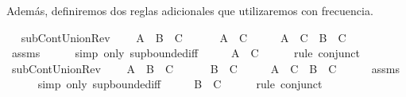 \begin{isabellebody}
\begin{isamarkuptext}
  Además, definiremos dos reglas adicionales que utilizaremos con 
  frecuencia.%
\end{isamarkuptext}\isamarkuptrue%
\ \isanewline
{}\isamarkupfalse%
\ subContUnionRev{}{\isacharcolon}\ \isanewline
\ \ \ {\isachardoublequoteopen}A\ {\isasymunion}\ B\ {\isasymsubseteq}\ C{\isachardoublequoteclose}\ \isanewline
\ \ \ \ \ {\isachardoublequoteopen}A\ {\isasymsubseteq}\ C{\isachardoublequoteclose}\isanewline
%
\isadelimproof
%
\endisadelimproof
%
\isatagproof
{}\isamarkupfalse%
\ {\isacharminus}\isanewline
\ \ \isamarkupfalse%
\ {\isachardoublequoteopen}A\ {\isasymsubseteq}\ C\ {\isasymand}\ B\ {\isasymsubseteq}\ C{\isachardoublequoteclose}\isanewline
\ \ \ \ \isamarkupfalse%
\ assms\isanewline
\ \ \ \ \isamarkupfalse%
\ {\isacharparenleft}simp\ only{\isacharcolon}\ sup{\isachardot}bounded{\isacharunderscore}iff{\isacharparenright}\isanewline
\ \ \isamarkupfalse%
\ \isamarkupfalse%
\ {\isachardoublequoteopen}A\ {\isasymsubseteq}\ C{\isachardoublequoteclose}\isanewline
\ \ \ \ \isamarkupfalse%
\ {\isacharparenleft}rule\ conjunct{}{\isacharparenright}\isanewline
{}\isamarkupfalse%
%
\endisatagproof
{\isafoldproof}%
%
\isadelimproof
\isanewline
%
\endisadelimproof
\isanewline
{}\isamarkupfalse%
\ subContUnionRev{}{\isacharcolon}\ \isanewline
\ \ \ {\isachardoublequoteopen}A\ {\isasymunion}\ B\ {\isasymsubseteq}\ C{\isachardoublequoteclose}\ \isanewline
\ \ \ \ \ {\isachardoublequoteopen}B\ {\isasymsubseteq}\ C{\isachardoublequoteclose}\isanewline
%
\isadelimproof
%
\endisadelimproof
%
\isatagproof
{}\isamarkupfalse%
\ {\isacharminus}\isanewline
\ \ \isamarkupfalse%
\ {\isachardoublequoteopen}A\ {\isasymsubseteq}\ C\ {\isasymand}\ B\ {\isasymsubseteq}\ C{\isachardoublequoteclose}\isanewline
\ \ \ \ \isamarkupfalse%
\ assms\isanewline
\ \ \ \ \isamarkupfalse%
\ {\isacharparenleft}simp\ only{\isacharcolon}\ sup{\isachardot}bounded{\isacharunderscore}iff{\isacharparenright}\isanewline
\ \ \isamarkupfalse%
\ \isamarkupfalse%
\ {\isachardoublequoteopen}B\ {\isasymsubseteq}\ C{\isachardoublequoteclose}\isanewline
\ \ \ \ \isamarkupfalse%
\ {\isacharparenleft}rule\ conjunct{}{\isacharparenright}\isanewline
{}\isamarkupfalse%

\end{isabellebody}
